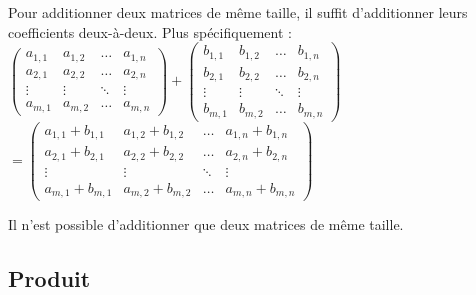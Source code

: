 	\begin{formula}
		\contentwidth[big]
		Pour additionner deux matrices de même taille, il suffit d'additionner leurs coefficients deux-à-deux. Plus spécifiquement :
		\newpar
		$\displaystyle{\begin{pmatrix}a_{1,1} & a_{1,2} & \dots & a_{1,n} \\ a_{2,1} & a_{2,2} & \dots & a_{2,n} \\ \vdots & \vdots & \ddots & \vdots \\ a_{m,1} & a_{m,2} & \dots & a_{m,n}\end{pmatrix} + \begin{pmatrix}b_{1,1} & b_{1,2} & \dots & b_{1,n} \\ b_{2,1} & b_{2,2} & \dots & b_{2,n} \\ \vdots & \vdots & \ddots & \vdots \\ b_{m,1} & b_{m,2} & \dots & b_{m,n}\end{pmatrix}}$
		\newpar
		$\displaystyle{= \begin{pmatrix}a_{1,1} + b_{1,1} & a_{1,2} + b_{1,2} & \dots & a_{1,n} + b_{1,n} \\ a_{2,1} + b_{2,1} & a_{2,2} + b_{2,2} & \dots & a_{2,n} + b_{2,n} \\ \vdots & \vdots & \ddots & \vdots \\ a_{m,1} + b_{m,1} & a_{m,2} + b_{m,2} & \dots & a_{m,n} + b_{m,n}\end{pmatrix}}$
	\end{formula}

	\begin{tip}[Attention !]
		Il n'est possible d'additionner que deux matrices de même taille.
	\end{tip}

	\subsection{Produit}

